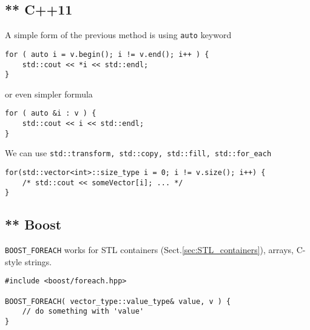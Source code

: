 %   
% 
%   
%   
% 


\subsection{** C++11}

A simple form of the previous method is using \verb!auto! keyword
\begin{verbatim}
for ( auto i = v.begin(); i != v.end(); i++ ) {
    std::cout << *i << std::endl;
}
\end{verbatim}
or even simpler formula
\begin{verbatim}
for ( auto &i : v ) {
    std::cout << i << std::endl;
}
\end{verbatim}

We can use \verb!std::transform, std::copy, std::fill, std::for_each!
\begin{verbatim}
for(std::vector<int>::size_type i = 0; i != v.size(); i++) {
    /* std::cout << someVector[i]; ... */
}
\end{verbatim}

\subsection{** Boost}
\label{sec:foreach_boost}

\verb!BOOST_FOREACH! works for STL containers (Sect.\ref{sec:STL_containers}),
arrays, C-style strings.

\begin{verbatim}
#include <boost/foreach.hpp>

BOOST_FOREACH( vector_type::value_type& value, v ) {
    // do something with 'value'
}
\end{verbatim}


